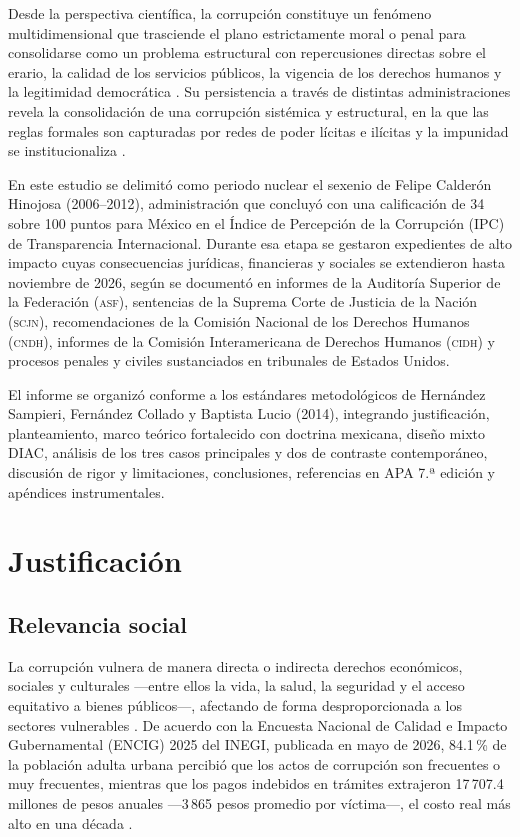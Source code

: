 \documentclass[12pt,letterpaper,oneside]{article}
\newcommand{\siglas}[1]{\textsc{#1}}
\begin{document}
Desde la perspectiva científica, la corrupción constituye un fenómeno multidimensional que trasciende el plano estrictamente moral o penal para consolidarse como un problema estructural con repercusiones directas sobre el erario, la calidad de los servicios públicos, la vigencia de los derechos humanos y la legitimidad democrática \citep{inegi2016,monsivais2020,reyesheroles2003}. Su persistencia a través de distintas administraciones revela la consolidación de una corrupción sistémica y estructural, en la que las reglas formales son capturadas por redes de poder lícitas e ilícitas y la impunidad se institucionaliza \citep{casar2024,merino2024,sandoval2024}.

En este estudio se delimitó como periodo nuclear el sexenio de Felipe Calderón Hinojosa (2006--2012), administración que concluyó con una calificación de 34 sobre 100 puntos para México en el Índice de Percepción de la Corrupción (IPC) de Transparencia Internacional. Durante esa etapa se gestaron expedientes de alto impacto cuyas consecuencias jurídicas, financieras y sociales se extendieron hasta noviembre de 2026, según se documentó en informes de la Auditoría Superior de la Federación (\siglas{asf}), sentencias de la Suprema Corte de Justicia de la Nación (\siglas{scjn}), recomendaciones de la Comisión Nacional de los Derechos Humanos (\siglas{cndh}), informes de la Comisión Interamericana de Derechos Humanos (\siglas{cidh}) y procesos penales y civiles sustanciados en tribunales de Estados Unidos.

El informe se organizó conforme a los estándares metodológicos de Hernández Sampieri, Fernández Collado y Baptista Lucio (2014), integrando justificación, planteamiento, marco teórico fortalecido con doctrina mexicana, diseño mixto DIAC, análisis de los tres casos principales y dos de contraste contemporáneo, discusión de rigor y limitaciones, conclusiones, referencias en APA 7.ª edición y apéndices instrumentales.

\clearpage

\section{Justificación}

\subsection{Relevancia social}

La corrupción vulnera de manera directa o indirecta derechos económicos, sociales y culturales ---entre ellos la vida, la salud, la seguridad y el acceso equitativo a bienes públicos---, afectando de forma desproporcionada a los sectores vulnerables \citep{cidh2019,cndh2019,rios2021}. De acuerdo con la Encuesta Nacional de Calidad e Impacto Gubernamental (ENCIG) 2025 del INEGI, publicada en mayo de 2026, 84.1\,\% de la población adulta urbana percibió que los actos de corrupción son frecuentes o muy frecuentes, mientras que los pagos indebidos en trámites extrajeron 17\,707.4 millones de pesos anuales ---3\,865 pesos promedio por víctima---, el costo real más alto en una década \citep{inegi2026,imco2026}.
\end{document}
